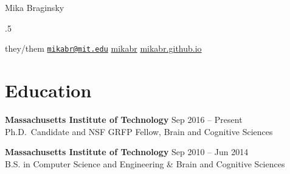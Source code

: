 \documentclass[11pt,]{article}
\begin{document}
\centerline{\Huge Mika Braginsky}


\vspace{1.5 mm}



\small


\moveleft.5\hoffset\centerline{ \scalebox{1.3}{\faCommentO}\hspace{.5 mm} they/them \hspace{2 mm} \scalebox{1.3}{\faEnvelopeO}\hspace{.5 mm} \href{mailto:mikabr@mit.edu}{\nolinkurl{mikabr@mit.edu}} \hspace{2 mm} \scalebox{1.5}{\faGithub}\hspace{.5 mm} \href{http://github.com/mikabr}{mikabr} \hspace{2 mm}    \scalebox{1.2}{\faExternalLink}\hspace{.5 mm} \href{http://mikabr.github.io}{mikabr.github.io}  \hspace{2 mm}    } %
\normalsize




\hypertarget{education}{%
\section{\texorpdfstring{\faGraduationCap \hspace{1pt}
Education}{ Education}}\label{education}}

\textbf{Massachusetts Institute of Technology} \hfill Sep 2016 --
Present\\
\hspace*{0.333em}\hspace*{0.333em}\hspace*{0.333em}\hspace*{0.333em}Ph.D.~Candidate
and NSF GRFP Fellow, Brain and Cognitive Sciences

\textbf{Massachusetts Institute of Technology} \hfill Sep 2010 -- Jun
2014\\
\hspace*{0.333em}\hspace*{0.333em}\hspace*{0.333em}\hspace*{0.333em}B.S.
in Computer Science and Engineering \& Brain and Cognitive Sciences
\end{document}
